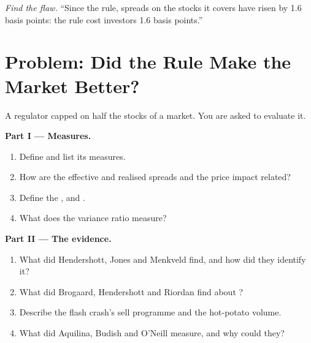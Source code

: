 \begin{exercise}[$\star\star\star$]\label{exo:mx:market-quality-and-regulation:8}
\emph{Find the flaw.} ``Since the rule, spreads on the stocks it covers have risen by 1.6 basis points: the rule cost investors 1.6 basis points.''
\end{exercise}

\section{Problem: Did the Rule Make the Market Better?}

\begin{problem}\label{pb:mx:market-quality-and-regulation:1}
A regulator capped  on half the stocks of a market. You are asked to evaluate it.

\medskip\noindent\textbf{Part I --- Measures.}
\begin{enumerate}
\item Define  and list its measures.
\item How are the effective and realised spreads and the price impact related?
\item Define the ,  and .
\item What does the variance ratio measure?
\end{enumerate}

\medskip\noindent\textbf{Part II --- The evidence.}
\begin{enumerate}[resume]
\item What did Hendershott, Jones and Menkveld find, and how did they identify it?
\item What did Brogaard, Hendershott and Riordan find about ?
\item Describe the flash crash's sell programme and the hot-potato volume.
\item What did Aquilina, Budish and O'Neill measure, and why could they?
\end{enumerate}


\end{problem}
